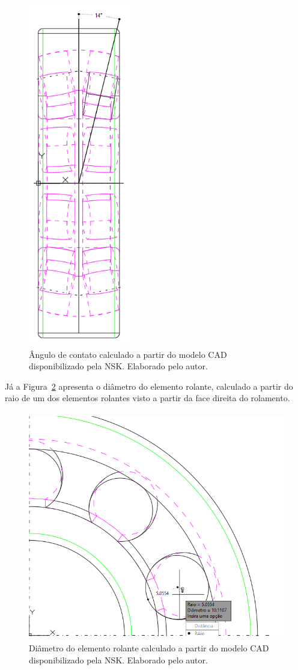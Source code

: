\documentclass[
	12pt,				
	oneside,			
	a4paper,			
	english,			
	brazil,			
	]{abntex2ppgsi}
\begin{document}
\begin{figure}[H]
\centering
\includegraphics[width=\textwidth,height=150mm,keepaspectratio]{angulo_de_contato}
\caption {Ângulo de contato calculado a partir do modelo CAD disponibilizado pela NSK. Elaborado pelo autor.}
\label{angulo_de_contato}
\end{figure} 

Já a Figura~\ref{diametro_rolamento} apresenta o diâmetro do elemento rolante, calculado a partir do raio de um dos elementos rolantes visto a partir da face direita do rolamento. 

\begin{figure}[H]
\centering
\includegraphics[width=\textwidth,height=100mm,keepaspectratio]{diametro_rolamento}
\caption {Diâmetro do elemento rolante calculado a partir do modelo CAD disponibilizado pela NSK. Elaborado pelo autor.}
\label{diametro_rolamento}
\end{figure} 
\end{document}
